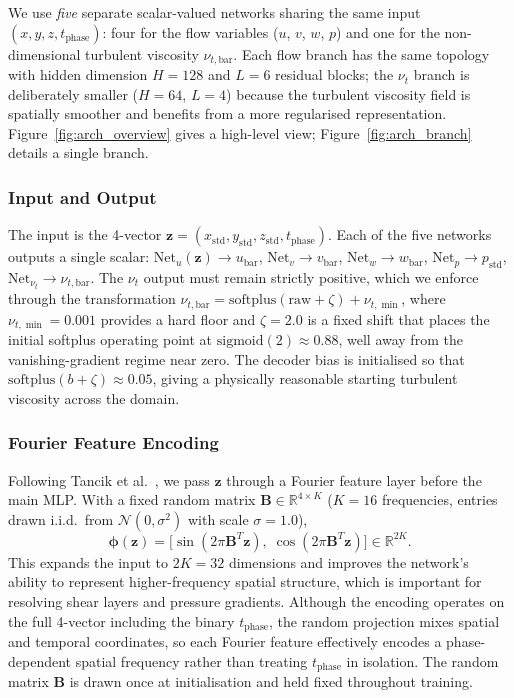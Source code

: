 \documentclass[11pt,a4paper]{article}
\begin{document}
We use \emph{five} separate scalar-valued networks sharing the same input $(x,y,z,t_{\text{phase}})$: four for the flow variables ($u$, $v$, $w$, $p$) and one for the non-dimensional turbulent viscosity $\nu_{t,\text{bar}}$. Each flow branch has the same topology with hidden dimension $H=128$ and $L=6$ residual blocks; the $\nu_t$ branch is deliberately smaller ($H=64$, $L=4$) because the turbulent viscosity field is spatially smoother and benefits from a more regularised representation. Figure~\ref{fig:arch_overview} gives a high-level view; Figure~\ref{fig:arch_branch} details a single branch.

\subsubsection{Input and Output}

The input is the 4-vector $\mathbf{z} = (x_{\text{std}}, y_{\text{std}}, z_{\text{std}}, t_{\text{phase}})$. Each of the five networks outputs a single scalar: $\mathrm{Net}_u(\mathbf{z}) \to u_{\text{bar}}$, $\mathrm{Net}_v \to v_{\text{bar}}$, $\mathrm{Net}_w \to w_{\text{bar}}$, $\mathrm{Net}_p \to p_{\text{std}}$, $\mathrm{Net}_{\nu_t} \to \nu_{t,\text{bar}}$. The $\nu_t$ output must remain strictly positive, which we enforce through the transformation $\nu_{t,\text{bar}} = \mathrm{softplus}(\mathrm{raw} + \zeta) + \nu_{t,\min}$, where $\nu_{t,\min} = 0.001$ provides a hard floor and $\zeta = 2.0$ is a fixed shift that places the initial softplus operating point at $\mathrm{sigmoid}(2) \approx 0.88$, well away from the vanishing-gradient regime near zero. The decoder bias is initialised so that $\mathrm{softplus}(b + \zeta) \approx 0.05$, giving a physically reasonable starting turbulent viscosity across the domain.

\subsubsection{Fourier Feature Encoding}

Following Tancik et al.\ \cite{ref_tancik2020}, we pass $\mathbf{z}$ through a Fourier feature layer before the main MLP. With a fixed random matrix $\mathbf{B} \in \mathbb{R}^{4 \times K}$ ($K=16$ frequencies, entries drawn i.i.d.\ from $\mathcal{N}(0, \sigma^2)$ with scale $\sigma = 1.0$),
\begin{equation}
\mathbf{\phi}(\mathbf{z}) = \bigl[ \sin(2\pi \mathbf{B}^T \mathbf{z}), \; \cos(2\pi \mathbf{B}^T \mathbf{z}) \bigr] \in \mathbb{R}^{2K}.
\end{equation}
This expands the input to $2K = 32$ dimensions and improves the network's ability to represent higher-frequency spatial structure, which is important for resolving shear layers and pressure gradients. Although the encoding operates on the full 4-vector including the binary $t_{\text{phase}}$, the random projection mixes spatial and temporal coordinates, so each Fourier feature effectively encodes a phase-dependent spatial frequency rather than treating $t_{\text{phase}}$ in isolation. The random matrix $\mathbf{B}$ is drawn once at initialisation and held fixed throughout training.
\end{document}
